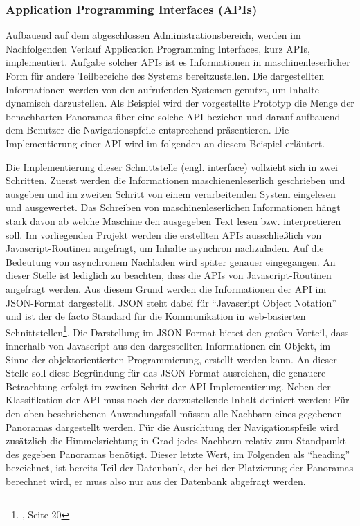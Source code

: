 \subsubsection{Application Programming Interfaces (APIs)}
\label{sec:APIs}

Aufbauend auf dem abgeschlossen Administrationsbereich, werden im Nachfolgenden Verlauf Application Programming Interfaces, kurz APIs, implementiert. Aufgabe solcher APIs ist es Informationen in maschinenleserlicher Form für andere Teilbereiche des Systems bereitzustellen. Die dargestellten Informationen werden von den aufrufenden Systemen genutzt, um Inhalte dynamisch darzustellen. Als Beispiel wird der vorgestellte Prototyp die Menge der benachbarten Panoramas über eine solche API beziehen und darauf aufbauend dem Benutzer die Navigationspfeile entsprechend präsentieren. Die Implementierung einer API wird im folgenden an diesem Beispiel erläutert.

Die Implementierung dieser Schnittstelle (engl. interface) vollzieht sich in zwei Schritten. Zuerst werden die Informationen maschienenleserlich geschrieben und ausgeben und im zweiten Schritt von einem verarbeitenden System eingelesen und ausgewertet. Das Schreiben von maschinenleserlichen Informationen hängt stark davon ab welche Maschine den ausgegeben Text lesen bzw. interpretieren soll. Im vorliegenden Projekt werden die erstellten APIs ausschließlich von Javascript-Routinen angefragt, um Inhalte asynchron nachzuladen. Auf die Bedeutung von asynchronem Nachladen wird später
genauer eingegangen.
An dieser Stelle ist lediglich zu beachten, dass die APIs von Javascript-Routinen angefragt werden. Aus diesem Grund werden die Informationen der API im JSON-Format dargestellt. JSON steht dabei für "`Javascript Object Notation"' und ist der de facto Standard für die Kommunikation in web-basierten Schnittstellen\footnote{\citet{lubbers2011}, Seite 20}. Die Darstellung im JSON-Format bietet den großen Vorteil, dass innerhalb von Javascript aus den dargestellten Informationen ein Objekt, im Sinne der objektorientierten Programmierung\footnotemark, erstellt werden kann. An dieser Stelle soll diese Begründung für das JSON-Format ausreichen, die genauere Betrachtung erfolgt im zweiten Schritt der API Implementierung. Neben der Klassifikation der API muss noch der darzustellende Inhalt definiert werden: Für den oben beschriebenen Anwendungsfall müssen alle Nachbarn eines gegebenen Panoramas dargestellt werden. Für die Ausrichtung der Navigationspfeile wird zusätzlich die Himmelsrichtung in Grad jedes Nachbarn relativ zum Standpunkt des gegeben Panoramas benötigt. Dieser letzte Wert, im Folgenden als "`heading"' bezeichnet, ist bereits Teil der Datenbank, der bei der Platzierung der Panoramas berechnet wird, er muss also nur aus der Datenbank abgefragt werden.

